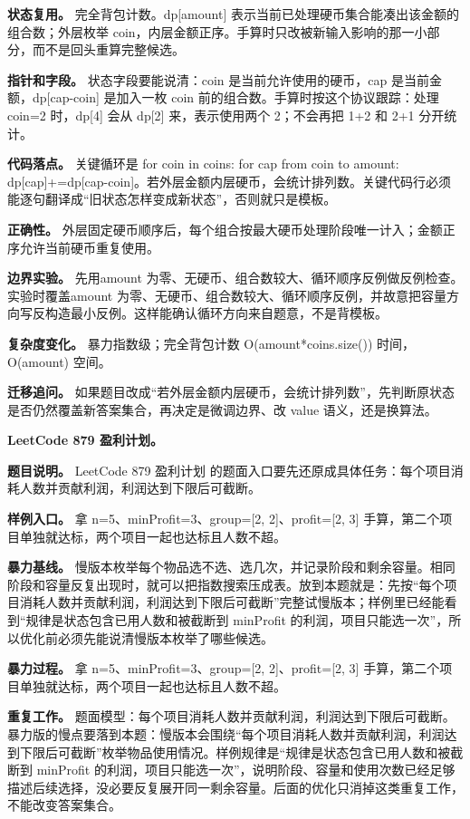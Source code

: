 \textbf{状态复用。} 完全背包计数。dp[amount] 表示当前已处理硬币集合能凑出该金额的组合数；外层枚举 coin，内层金额正序。手算时只改被新输入影响的那一小部分，而不是回头重算完整候选。

\textbf{指针和字段。} 状态字段要能说清：coin 是当前允许使用的硬币，cap 是当前金额，dp[cap-coin] 是加入一枚 coin 前的组合数。手算时按这个协议跟踪：处理 coin=2 时，dp[4] 会从 dp[2] 来，表示使用两个 2；不会再把 1+2 和 2+1 分开统计。

\textbf{代码落点。} 关键循环是 for coin in coins: for cap from coin to amount: dp[cap]+=dp[cap-coin]。若外层金额内层硬币，会统计排列数。关键代码行必须能逐句翻译成“旧状态怎样变成新状态”，否则就只是模板。

\textbf{正确性。} 外层固定硬币顺序后，每个组合按最大硬币处理阶段唯一计入；金额正序允许当前硬币重复使用。

\textbf{边界实验。} 先用amount 为零、无硬币、组合数较大、循环顺序反例做反例检查。实验时覆盖amount 为零、无硬币、组合数较大、循环顺序反例，并故意把容量方向写反构造最小反例。这样能确认循环方向来自题意，不是背模板。

\textbf{复杂度变化。} 暴力指数级；完全背包计数 O(amount*coins.size()) 时间，O(amount) 空间。

\textbf{迁移追问。} 如果题目改成“若外层金额内层硬币，会统计排列数”，先判断原状态是否仍然覆盖新答案集合，再决定是微调边界、改 value 语义，还是换算法。

\noindent\textbf{LeetCode 879 盈利计划。}

\textbf{题目说明。} LeetCode 879 盈利计划 的题面入口要先还原成具体任务：每个项目消耗人数并贡献利润，利润达到下限后可截断。

\textbf{样例入口。} 拿 n=5、minProfit=3、group=[2, 2]、profit=[2, 3] 手算，第二个项目单独就达标，两个项目一起也达标且人数不超。

\textbf{暴力基线。} 慢版本枚举每个物品选不选、选几次，并记录阶段和剩余容量。相同阶段和容量反复出现时，就可以把指数搜索压成表。放到本题就是：先按“每个项目消耗人数并贡献利润，利润达到下限后可截断”完整试慢版本；样例里已经能看到“规律是状态包含已用人数和被截断到 minProfit 的利润，项目只能选一次”，所以优化前必须先能说清慢版本枚举了哪些候选。

\textbf{暴力过程。} 拿 n=5、minProfit=3、group=[2, 2]、profit=[2, 3] 手算，第二个项目单独就达标，两个项目一起也达标且人数不超。

\textbf{重复工作。} 题面模型：每个项目消耗人数并贡献利润，利润达到下限后可截断。暴力版的慢点要落到本题：慢版本会围绕“每个项目消耗人数并贡献利润，利润达到下限后可截断”枚举物品使用情况。样例规律是“规律是状态包含已用人数和被截断到 minProfit 的利润，项目只能选一次”，说明阶段、容量和使用次数已经足够描述后续选择，没必要反复展开同一剩余容量。后面的优化只消掉这类重复工作，不能改变答案集合。

